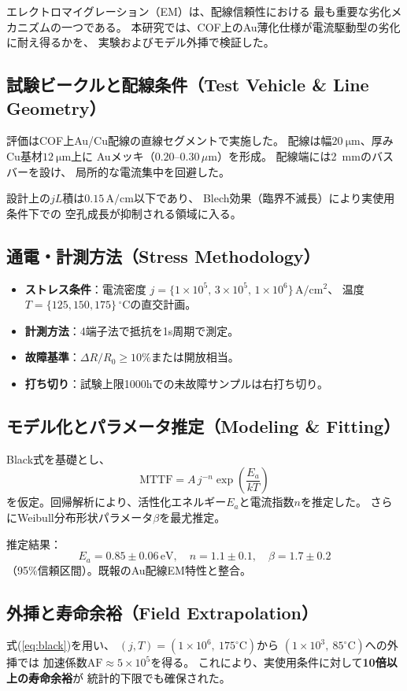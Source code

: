 \documentclass[conference]{IEEEtran}
\begin{document}
エレクトロマイグレーション（EM）は、配線信頼性における
最も重要な劣化メカニズムの一つである。
本研究では、COF上のAu薄化仕様が電流駆動型の劣化に耐え得るかを、
実験およびモデル外挿で検証した。

\subsection{試験ビークルと配線条件（Test Vehicle \& Line Geometry）}
評価はCOF上Au/Cu配線の直線セグメントで実施した。
配線は幅$\SI{20}{\micro\meter}$、厚みCu基材$\SI{12}{\micro\meter}$上に
Auメッキ（$0.20$--$0.30\,\mu$m）を形成。
配線端には\SI{2}{\milli\meter}のバスバーを設け、
局所的な電流集中を回避した。

設計上の$jL$積は$0.15\,\mathrm{A/cm}$以下であり、
Blech効果（臨界不滅長）により実使用条件下での
空孔成長が抑制される領域に入る\cite{Blech}。

\subsection{通電・計測方法（Stress Methodology）}
\begin{itemize}
  \item \textbf{ストレス条件}：電流密度
  $j=\{1\times10^5,\,3\times10^5,\,1\times10^6\}\,\mathrm{A/cm^2}$、
  温度$T=\{125,150,175\}\,^\circ$Cの直交計画。
  \item \textbf{計測方法}：4端子法で抵抗を1s周期で測定。
  \item \textbf{故障基準}：$\Delta R/R_0\geq 10\%$または開放相当。
  \item \textbf{打ち切り}：試験上限1000hでの未故障サンプルは右打ち切り。
\end{itemize}

\subsection{モデル化とパラメータ推定（Modeling \& Fitting）}
Black式\cite{Black}を基礎とし、
\begin{equation}
  \mathrm{MTTF} = A\, j^{-n} \exp\!\left(\frac{E_a}{kT}\right)
  \label{eq:black}
\end{equation}
を仮定。回帰解析により、活性化エネルギー$E_a$と電流指数$n$を推定した。
さらにWeibull分布形状パラメータ$\beta$を最尤推定。

推定結果：
\[
  E_a = 0.85 \pm 0.06 \,\mathrm{eV},\quad n = 1.1 \pm 0.1,\quad \beta = 1.7 \pm 0.2
\]
（95\%信頼区間）。既報のAu配線EM特性と整合。

\subsection{外挿と寿命余裕（Field Extrapolation）}
式(\ref{eq:black})を用い、
$(j,T)=(1\times10^6,\ 175^\circ\mathrm{C})$から
$(1\times10^3,\ 85^\circ\mathrm{C})$への外挿では
加速係数$\mathrm{AF}\approx 5\times10^5$を得る。
これにより、実使用条件に対して\textbf{10倍以上の寿命余裕}が
統計的下限でも確保された。
\end{document}
